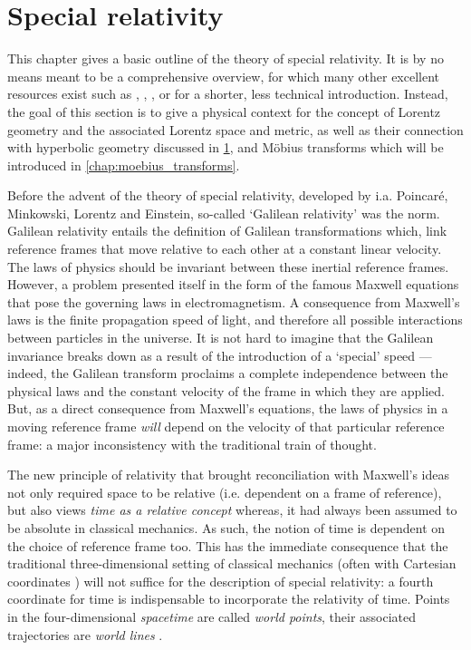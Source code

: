 \chapter{Special relativity}
\label{chap:relativity}
This chapter gives a basic outline of the theory of special relativity. It is by no means meant to be a comprehensive overview, for which many other excellent resources exist such as \citet{Misner1970}, \citet{Taylor1992}, \citet{Landau1971}, or \citet{Penrose1978} for a shorter, less technical introduction. Instead, the goal of this section is to give a physical context for the concept of Lorentz geometry and the associated Lorentz space and metric, as well as their connection with hyperbolic geometry discussed in \cref{chap:relativity}, and Möbius transforms which will be introduced in \cref{chap:moebius_transforms}.

Before the advent of the theory of special relativity, developed by i.a. Poincaré, Minkowski, Lorentz and Einstein, so-called `Galilean relativity' was the norm. Galilean relativity entails the definition of Galilean transformations which, link reference frames that move relative to each other at a constant linear velocity. The laws of physics should be invariant between these inertial reference frames. However, a problem presented itself in the form of the famous Maxwell equations that pose the governing laws in electromagnetism. A consequence from Maxwell's laws is the finite propagation speed of light, and therefore all possible interactions between particles in the universe. It is not hard to imagine that the Galilean invariance breaks down as a result of the introduction of a `special' speed --- indeed, the Galilean transform proclaims a complete independence between the physical laws and the constant velocity of the frame in which they are applied. But, as a direct consequence from Maxwell's equations, the laws of physics in a moving reference frame \emph{will} depend on the velocity of that particular reference frame: a major inconsistency with the traditional train of thought.

The new principle of relativity that brought reconciliation with Maxwell's ideas not only required space to be relative (i.e. dependent on a frame of reference), but also views \emph{time as a relative concept} whereas, it had always been assumed to be absolute in classical mechanics. As such, the notion of time is dependent on the choice of reference frame too. This has the immediate consequence that the traditional three-dimensional setting of classical mechanics (often with Cartesian coordinates ) will not suffice for the description of special relativity: a fourth coordinate for time is indispensable to incorporate the relativity of time. Points in the four-dimensional \emph{spacetime} are called \emph{world points}, their associated trajectories are \emph{world lines} \cite{Landau1971}.

